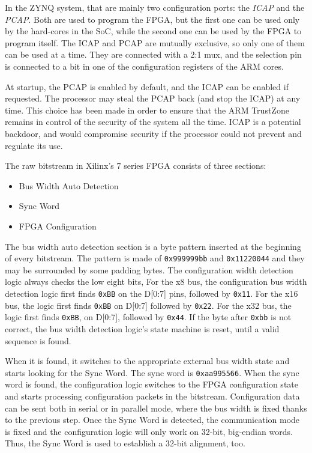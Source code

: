 In the ZYNQ system, that are mainly two configuration ports: the \textit{ICAP} and the \textit{PCAP}. Both are used to program the FPGA, but the first one can be used only by the hard-cores in the SoC, while the second one can be used by the FPGA to program itself. The ICAP and PCAP are mutually exclusive, so only one of them can be used at a time. They are connected with a 2:1 mux, and the selection pin is connected to a bit in one of the configuration registers of the ARM cores. \bigskip

At startup, the PCAP is enabled by default, and the ICAP can be enabled if requested. The processor may steal the PCAP back (and stop the ICAP) at any time. This choice has been made in order to ensure that the ARM TrustZone remains in control of the security of the system all the time. ICAP is a potential backdoor, and would compromise security if the processor could not prevent and regulate its use.\bigskip

The raw bitstream in Xilinx's 7 series FPGA consists of three sections:
\begin{itemize}
    \item Bus Width Auto Detection
    \item Sync Word
    \item FPGA Configuration
\end{itemize}

The bus width auto detection section is a byte pattern inserted at the beginning of every bitstream. The pattern is made of \texttt{0x999999bb} and \texttt{0x11220044} and they may be surrounded by some padding bytes. The configuration width detection logic always checks the low eight bits, For the x8 bus, the configuration bus width detection logic first finds \texttt{0xBB} on the D[0:7] pins, followed by \texttt{0x11}. For the x16 bus, the logic first finds \texttt{0xBB} on D[0:7] followed by \texttt{0x22}. For the x32 bus, the logic first finds \texttt{0xBB}, on D[0:7], followed by \texttt{0x44}. If the byte after \texttt{0xbb} is not correct, the bus width detection logic's state machine is reset, until a valid sequence is found. \bigskip

When it is found, it switches to the appropriate external bus width state and starts looking for the Sync Word. The sync word is \texttt{0xaa995566}. When the sync word is found, the configuration logic switches to the FPGA configuration state and starts processing configuration packets in the bitstream. Configuration data can be sent both in serial or in parallel mode, where the bus width is fixed thanks to the previous step. Once the Sync Word is detected, the communication mode is fixed and the configuration logic will only work on 32-bit, big-endian words. Thus, the Sync Word is used to establish a 32-bit alignment, too. \bigskip

